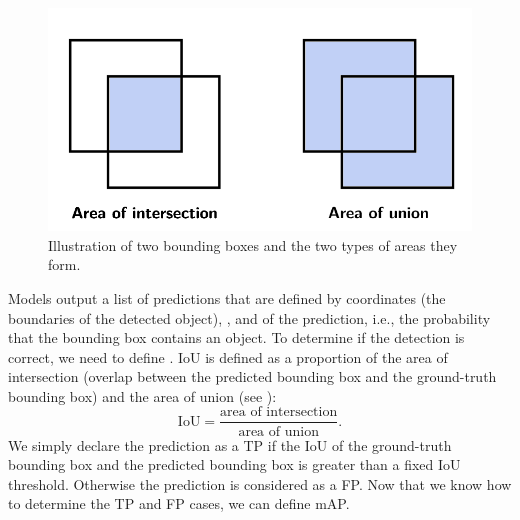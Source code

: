 \begin{figure}[H]
    \centering
    \includegraphics[width=0.6\linewidth]{Sources/Figures/iou.png}
    \caption{Illustration of two bounding boxes and the two types of areas they
        form.}
    \label{fig:iou}
\end{figure}

Models output a list of predictions that are defined by 
coordinates (the boundaries of the detected object), , and
 of the prediction, i.e., the probability that the
bounding box contains an object. To determine if the detection is correct, we
need to define . IoU is defined as a
proportion of the area of intersection (overlap between the predicted bounding
box and the ground-truth bounding box) and the area of union
(see ):
$$
    \text{IoU} = \frac{\text{area of intersection}}{\text{area of union}}.
$$
We simply declare the prediction as a TP if the IoU of the ground-truth bounding
box and the predicted bounding box is greater than a fixed IoU threshold.
Otherwise the prediction is considered as a FP. Now that we know how to determine
the TP and FP cases, we can define mAP.

